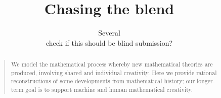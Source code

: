 \documentclass[letterpaper]{article}
\title{Chasing the blend}
\author{Several\\
check if this should be blind submission?
}
\begin{document}
 
\maketitle
\begin{abstract}
\begin{quote}
We model the mathematical process whereby new mathematical
theories are produced, involving shared and individual creativity.
Here we provide rational reconstructions of some developments
from mathematical history;  our longer-term goal is to support
machine and human mathematical creativity.
\end{quote}
\end{abstract}









\nocite{Weil60}
\nocite{Boden90}
\nocite{nunez05}
\nocite{Lak00}
\nocite{Gog05,Gog99}

\printbibliography
\end{document}
